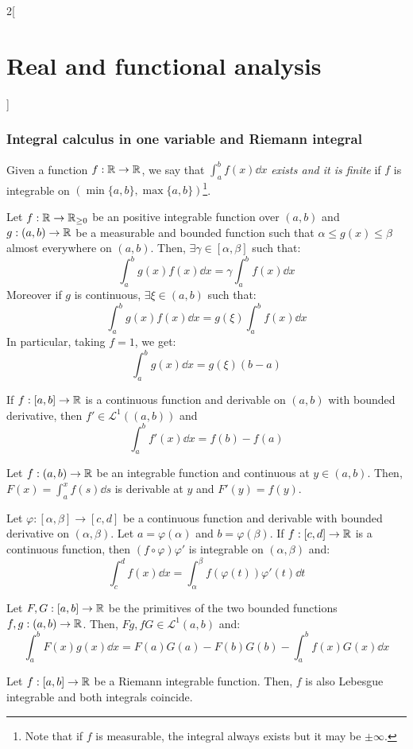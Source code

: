 \documentclass[../../../main_math.tex]{subfiles}
\begin{document}
\begin{multicols}{2}[\section{Real and functional analysis}]
  \subsubsection{Integral calculus in one variable and Riemann integral}
  \begin{definition}
    Given a function $f:\mathbb{R}\rightarrow\mathbb{R}$, we say that $\int_a^bf(x)\dd{x}$ \emph{exists and it is finite} if $f$ is integrable on $(\min\{a,b\},\max\{a,b\})$\footnote{Note that if $f$ is measurable, the integral always exists but it may be $\pm\infty$.}.
  \end{definition}
  \begin{theorem}
    Let $f:\mathbb{R}\rightarrow\mathbb{R}_{\geq 0}$ be an positive integrable function over $(a,b)$ and $g:(a,b)\rightarrow\mathbb{R}$ be a measurable and bounded function such that $\alpha\leq g(x)\leq\beta$ almost everywhere on $(a,b)$. Then, $\exists\gamma\in[\alpha,\beta]$ such that: $$\int_a^bg(x)f(x)\dd{x}=\gamma\int_a^bf(x)\dd{x}$$
    Moreover if $g$ is continuous, $\exists\xi\in(a,b)$ such that: $$\int_a^bg(x)f(x)\dd{x}=g(\xi)\int_a^bf(x)\dd{x}$$
    In particular, taking $f=1$, we get:  $$\int_a^bg(x)\dd{x}=g(\xi)(b-a)$$
  \end{theorem}
  \begin{theorem}
    If $f:[a,b]\rightarrow\mathbb{R}$ is a continuous function and derivable on $(a,b)$ with bounded derivative, then $f'\in \mathcal{L}^1((a,b))$ and $$\int_a^bf'(x)\dd{x}=f(b)-f(a)$$
  \end{theorem}
  \begin{theorem}
    Let $f:(a,b)\rightarrow\mathbb{R}$ be an integrable function and continuous at $y\in (a,b)$. Then, $F(x)=\int_a^xf(s)\dd{s}$ is derivable at $y$ and $F'(y)=f(y)$.
  \end{theorem}
  \begin{theorem}
    Let $\varphi:[\alpha,\beta]\rightarrow[c,d]$ be a continuous function and derivable with bounded derivative on $(\alpha,\beta)$. Let $a=\varphi(\alpha)$ and $b=\varphi(\beta)$. If $f:[c,d]\rightarrow\mathbb{R}$ is a continuous function, then $(f\circ\varphi)\varphi'$ is integrable on $(\alpha,\beta)$ and: $$\int_c^df(x)\dd{x}=\int_\alpha^\beta f(\varphi(t))\varphi'(t)\dd{t}$$
  \end{theorem}
  \begin{theorem}
    Let $F,G:[a,b]\rightarrow\mathbb{R}$ be the primitives of the two bounded functions $f,g:(a,b)\rightarrow\mathbb{R}$. Then, $Fg,fG\in \mathcal{L}^1(a,b)$ and: $$\int_a^bF(x)g(x)\dd{x}=F(a)G(a)-F(b)G(b)-\int_a^bf(x)G(x)\dd{x}$$
  \end{theorem}
  \begin{theorem}
    Let $f:[a,b]\rightarrow\mathbb{R}$ be a Riemann integrable function. Then, $f$ is also Lebesgue integrable and both integrals coincide.
  \end{theorem}

\end{multicols}
\end{document}
